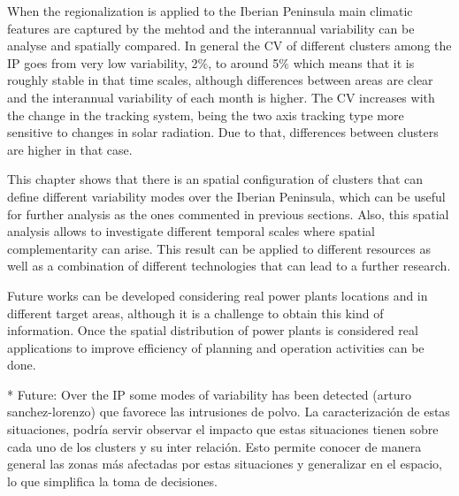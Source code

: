 When the regionalization is applied to the Iberian Peninsula main climatic features are captured by the mehtod and the interannual variability can be analyse and spatially compared. In general the CV of different clusters among the IP goes from very low variability, 2$\%$, to around 5$\%$ which means that it is roughly stable in that time scales, although differences between areas are clear and the interannual variability of each month is higher. The CV increases with the change in the tracking system, being the two axis tracking type more sensitive to changes in solar radiation. Due to that, differences between clusters are higher in that case.

This chapter shows that there is an spatial configuration of clusters that can define different variability modes over the Iberian Peninsula, which can be useful for further analysis as the ones commented in previous sections. Also, this spatial analysis allows to investigate different temporal scales where spatial complementarity can arise. This result can be applied to different resources as well as a combination of different technologies that can lead to a further research.

Future works can be developed considering real power plants locations and in different target areas, although it is a challenge to obtain this kind of information. Once the spatial distribution of power plants is considered real applications to improve efficiency of planning and operation activities can be done.

* Future: Over the IP some modes of variability has been detected (arturo sanchez-lorenzo) que favorece las intrusiones de polvo. La caracterización de estas situaciones, podría servir observar el impacto que estas situaciones tienen sobre cada uno de los clusters y su inter relación.  Esto permite conocer de manera general las zonas más afectadas por estas situaciones y generalizar en el espacio, lo que simplifica la toma de decisiones.


